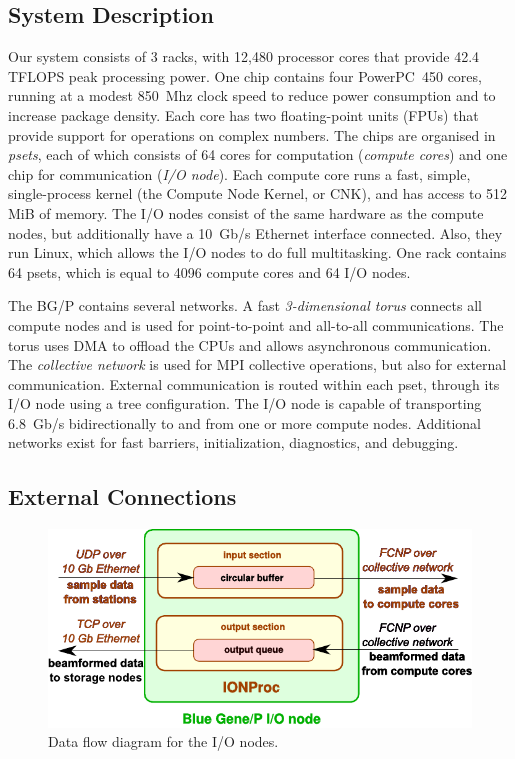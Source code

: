 \documentclass{llncs}
\begin{document}
\subsection{System Description}

Our system consists of 3 racks, with 12,480 processor cores that provide 42.4 TFLOPS peak processing power. One chip contains four PowerPC~450 cores, running at a modest 850~Mhz clock speed to reduce power consumption and to increase package density. Each core has two floating-point units (FPUs) that provide support for operations on complex numbers. The chips are organised in \emph{psets}, each of which consists of 64 cores for computation (\emph{compute cores}) and one chip for communication (\emph{I/O node}). Each compute core runs a fast, simple, single-process kernel (the Compute Node Kernel, or CNK), and has access to 512 MiB of memory. The I/O nodes consist of the same hardware as the compute nodes, but additionally have a 10~Gb/s Ethernet interface connected. Also, they run Linux, which allows the I/O nodes to do full multitasking. One rack contains 64 psets, which is equal to 4096 compute cores and 64 I/O nodes.

The BG/P contains several networks. A fast \emph{3-dimensional torus\/} connects all compute nodes and is used for point-to-point and all-to-all communications. The torus uses DMA to offload the CPUs and allows asynchronous communication. The \emph{collective network\/} is used for MPI collective operations, but also for external communication. External communication is routed within each pset, through its I/O node using a tree configuration. The I/O node is capable of transporting 6.8~Gb/s bidirectionally to and from one or more compute nodes. Additional networks exist for fast barriers, initialization, diagnostics, and debugging. %

\subsection{External Connections}

\begin{figure}[ht]
\includegraphics[width=\textwidth]{ION-processing.pdf}
\caption{Data flow diagram for the I/O nodes.}
\label{fig:ion-processing}
\end{figure}
\end{document}
